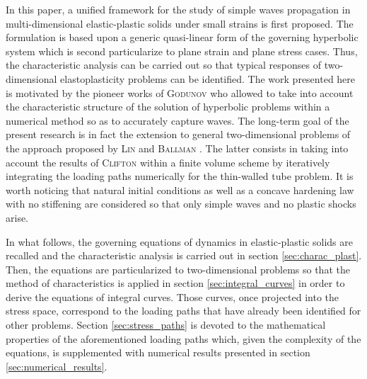 In this paper, a unified framework for the study of simple waves propagation in multi-dimensional elastic-plastic solids under small strains is first proposed.
The formulation is based upon a generic quasi-linear form of the governing hyperbolic system which is second particularize to plane strain and plane stress cases.
Thus, the characteristic analysis can be carried out so that typical responses of two-dimensional elastoplasticity problems can be identified.
The work presented here is motivated by the pioneer works of \textsc{Godunov} \cite{Godunov_method} who allowed to take into account the characteristic structure of the solution of hyperbolic problems within a numerical method so as to accurately capture waves.
The long-term goal of the present research is in fact the extension to general two-dimensional problems of the approach proposed by \textsc{Lin} and \textsc{Ballman} \cite{Lin_et_Ballman}.
The latter consists in taking into account the results of \textsc{Clifton} within a finite volume scheme by iteratively integrating the loading paths numerically for the thin-walled tube problem.
It is worth noticing that natural initial conditions as well as a concave hardening law with no stiffening are considered so that only simple waves and no plastic shocks arise.

In what follows, the governing equations of dynamics in elastic-plastic solids are recalled and the characteristic analysis is carried out in section \ref{sec:charac_plast}.
Then, the equations are particularized to two-dimensional problems so that the method of characteristics is applied in section \ref{sec:integral_curves} in order to derive the equations of integral curves.
Those curves, once projected into the stress space, correspond to the loading paths that have already been identified for other problems.
Section \ref{sec:stress_paths} is devoted to the mathematical properties of the aforementioned loading paths which, given the complexity of the equations, is supplemented with numerical results presented in section \ref{sec:numerical_results}.




